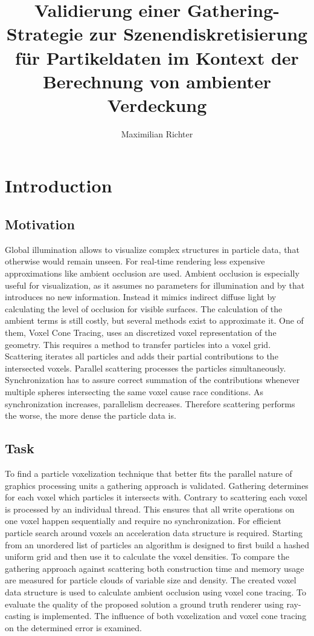 \documentclass[hyperref,german,diplominf]{cgvpub}
\author{Maximilian Richter}
\title{Validierung einer Gathering-Strategie zur Szenendiskretisierung f\"ur Partikeldaten im Kontext der Berechnung von ambienter Verdeckung}
\begin{document}
\chapter{Introduction}

\section{Motivation}
Global illumination allows to visualize complex structures in particle data, that otherwise would remain unseen. For real-time rendering less expensive approximations like ambient occlusion are used. Ambient occlusion is especially useful for visualization, as it assumes no parameters for illumination and by that introduces no new information. Instead it mimics indirect diffuse light by calculating the level of occlusion for visible surfaces. The calculation of the ambient terms is still costly, but several methods exist to approximate it. One of them, Voxel Cone Tracing, uses an discretized voxel representation of the geometry. This requires a method to transfer particles into a voxel grid. Scattering iterates all particles and adds their partial contributions to the intersected voxels. Parallel scattering processes the particles simultaneously. Synchronization has to assure correct summation of the contributions whenever multiple spheres intersecting the same voxel cause race conditions. As synchronization increases, parallelism decreases. Therefore scattering performs the worse, the more dense the particle data is.

\section{Task}
To find a particle voxelization technique that better fits the parallel nature of graphics processing units a gathering approach is validated.
Gathering determines for each voxel which particles it intersects with.
Contrary to scattering each voxel is processed by an individual thread.
This ensures that all write operations on one voxel happen sequentially and require no synchronization.
For efficient particle search around voxels an acceleration data structure is required.
Starting from an unordered list of particles an algorithm is designed to first build a hashed uniform grid and then use it to calculate the voxel densities.
To compare the gathering approach against scattering both construction time and memory usage are measured for particle clouds of variable size and density.
The created voxel data structure is used to calculate ambient occlusion using voxel cone tracing.
To evaluate the quality of the proposed solution a ground truth renderer using ray-casting is implemented. The influence of both voxelization and voxel cone tracing on the determined error is examined.
\end{document}
